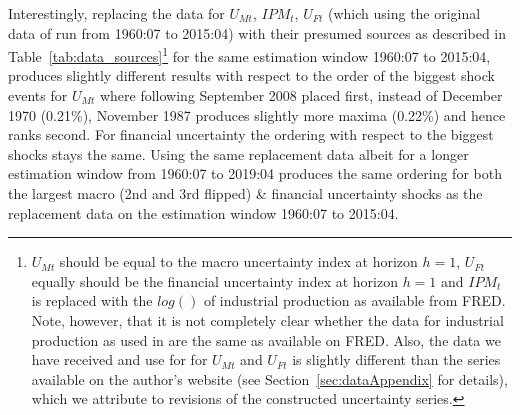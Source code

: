 \documentclass[a4paper,11pt,listof=nochaptergap,oneside,pointednumbers,bibtotoc,bigheadings,liststotoc,hidelinks]{scrbook}
\theoremstyle{mysatz}
\theoremstyle{mydefinition}
\theoremstyle{mytheorem}
\theoremstyle{mybemerkung}
\begin{document}
Interestingly, replacing the data for $U_{Mt}$, $IPM_{t}$, $U_{Ft}$ (which using the original data of \citet{ludvigsonetal:18, ludvigsonetal:19} run from 1960:07 to 2015:04) with their presumed sources as described in Table~\ref{tab:data_sources}\footnote{$U_{Mt}$ should be equal to the macro uncertainty index at horizon $h=1$, $U_{Ft}$ equally should be the financial uncertainty index at horizon $h=1$ and $IPM_{t}$ is replaced with the $log()$ of industrial production as available from FRED. Note, however, that it is not completely clear whether the data for industrial production as used in \citet{ludvigsonetal:18, ludvigsonetal:19} are the same as available on FRED. Also, the data we have received and use for for $U_{Mt}$ and $U_{Ft}$ is slightly different than the series available on the author's website (see Section~\ref{sec:dataAppendix} for details), which we attribute to revisions of the constructed uncertainty series.} for the same estimation window 1960:07 to 2015:04, produces slightly different results with respect to the order of the biggest shock events for $U_{Mt}$ where following September 2008 placed first, instead of December 1970 (0.21\%), November 1987 produces slightly more maxima (0.22\%) and hence ranks second. For financial uncertainty the ordering with respect to the biggest shocks stays the same. Using the same replacement data albeit for a longer estimation window from 1960:07 to 2019:04 produces the same ordering for both the largest macro (2nd and 3rd flipped) \& financial uncertainty shocks as the replacement data on the estimation window 1960:07 to 2015:04. 
\end{document}
